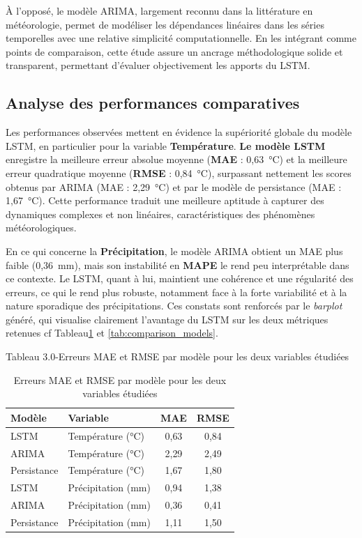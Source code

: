 \documentclass[a4paper,12pt,openany]{report}
\begin{document}
	À l’opposé, le modèle ARIMA, largement reconnu dans la littérature en météorologie, permet de modéliser les dépendances linéaires dans les séries temporelles avec une relative simplicité computationnelle. En les intégrant comme points de comparaison, cette étude assure un ancrage méthodologique solide et transparent, permettant d’évaluer objectivement les apports du LSTM.
	
	\subsection{Analyse des performances comparatives}
	
	\quad
	Les performances observées mettent en évidence la supériorité globale du modèle LSTM, en particulier pour la variable \textbf{Température}. \textbf{Le modèle LSTM} enregistre la meilleure erreur absolue moyenne (\textbf{MAE} : 0{,}63~°C) et la meilleure erreur quadratique moyenne (\textbf{RMSE} : 0{,}84~°C), surpassant nettement les scores obtenus par ARIMA (MAE : 2{,}29~°C) et par le modèle de persistance (MAE : 1{,}67~°C). Cette performance traduit une meilleure aptitude à capturer des dynamiques complexes et non linéaires, caractéristiques des phénomènes météorologiques.
	
	En ce qui concerne la \textbf{Précipitation}, le modèle ARIMA obtient un MAE plus faible (0{,}36~mm), mais son instabilité en \textbf{MAPE} le rend peu interprétable dans ce contexte. Le LSTM, quant à lui, maintient une cohérence et une régularité des erreurs, ce qui le rend plus robuste, notamment face à la forte variabilité et à la nature sporadique des précipitations. Ces constats sont renforcés par le \textit{barplot} généré, qui visualise clairement l’avantage du LSTM sur les deux métriques retenues cf Tableau\ref{tab:resultats_mae_rmse} et \ref{tab:comparison_models}.
	\begin{center}
		\begin{table}
		\caption{Erreurs MAE et RMSE par modèle pour les deux variables étudiées}
		Tableau 3.0-Erreurs MAE et RMSE par modèle pour les deux variables étudiées
		
		\begin{tabular}{|l|l|c|c|}
			\hline
			\textbf{Modèle} & \textbf{Variable} & \textbf{MAE} & \textbf{RMSE} \\
			\hline
			LSTM & Température (°C)   & 0{,}63 & 0{,}84 \\
			\hline
			ARIMA & Température (°C)  & 2{,}29 & 2{,}49 \\
			\hline
			Persistance & Température (°C) & 1{,}67 & 1{,}80 \\
			\hline
			\hline
			LSTM & Précipitation (mm) & 0{,}94 & 1{,}38 \\
			\hline
			ARIMA & Précipitation (mm) & 0{,}36 & 0{,}41 \\
			\hline
			Persistance & Précipitation (mm) & 1{,}11 & 1{,}50 \\
			\hline
		\end{tabular}
		\label{tab:resultats_mae_rmse}
	\end{table}
	\end{center}
	
\end{document}
